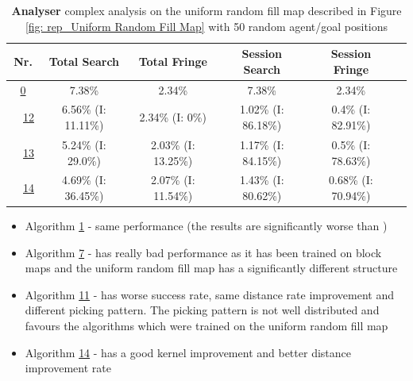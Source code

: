 \begin{table}[h!]
\bigskip

\begin{tabular}{|cc|c|c|c|c|c|}
\hline
\multicolumn{2}{|c|}{\textbf{Nr.}} & \textbf{Total Search} & \textbf{Total Fringe} & \textbf{Session Search} & \textbf{Session Fringe}\\
\hline
\hline
\multicolumn{2}{|c|}{\cellcolor{lightgray!20} \hyperref[tab: evalalgorithms]{0}} & 7.38\% & 2.34\% & 7.38\% & 2.34\%\\
\hline
\hline
\multicolumn{1}{|M{0.15cm}}{\cellcolor{cyan!40}} & \multicolumn{1}{M{0.15cm}|}{\cellcolor{blue!40} \hspace*{-0.5cm}\hyperref[tab: evalalgorithms]{12}} & 6.56\% (I: 11.11\%) & 2.34\% (I: 0\%) & 1.02\% (I: 86.18\%) & 0.4\% (I: 82.91\%)\\
\hline
\multicolumn{1}{|M{0.15cm}}{\cellcolor{cyan!40}} & \multicolumn{1}{M{0.15cm}|}{\cellcolor{red!40} \hspace*{-0.5cm}\hyperref[tab: evalalgorithms]{13}} & 5.24\% (I: 29.0\%) & 2.03\% (I: 13.25\%) & 1.17\% (I: 84.15\%) & 0.5\% (I: 78.63\%)\\
\hline
\multicolumn{1}{|M{0.15cm}}{\cellcolor{cyan!40}} & \multicolumn{1}{M{0.15cm}|}{\cellcolor{orange!40} \hspace*{-0.5cm}\hyperref[tab: evalalgorithms]{14}} & 4.69\% (I: 36.45\%) & 2.07\% (I: 11.54\%) & 1.43\% (I: 80.62\%) & 0.68\% (I: 70.94\%)\\
\hline
\end{tabular}


\caption{\textbf{Analyser} complex analysis on the uniform random fill map described in Figure \ref{fig: rep_Uniform Random Fill Map} with 50 random agent/goal positions}
\label{tab: eval_complex_analysis_map_1} 
\end{table}

\begin{itemize}
    \item Algorithm \hyperref[tab: evalalgorithms]{1} - same performance (the results are significantly worse than \cite{nicola2018lstm})
    \item Algorithm \hyperref[tab: evalalgorithms]{7} - has really bad performance as it has been trained on block maps and the uniform random fill map has a significantly different structure
    \item Algorithm \hyperref[tab: evalalgorithms]{11} - has worse success rate, same distance rate improvement and different picking pattern. The picking pattern is not well distributed and favours the algorithms which were trained on the uniform random fill map
    \item Algorithm \hyperref[tab: evalalgorithms]{14} - has a good kernel improvement and better distance improvement rate 
\end{itemize}

\pagebreak